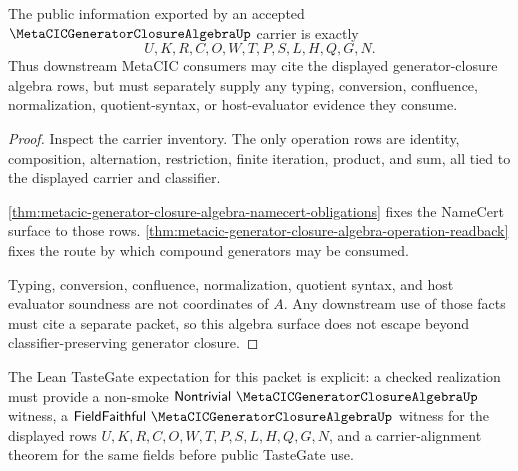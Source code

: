 \begin{theorem}
\label{thm:metacic-generator-closure-algebra-nonescape}
The public information exported by an accepted $\MetaCICGeneratorClosureAlgebraUp$ carrier is exactly
$$
U,K,R,C,O,W,T,P,S,L,H,Q,G,N .
$$
Thus downstream MetaCIC consumers may cite the displayed generator-closure algebra rows, but must separately supply any typing, conversion, confluence, normalization, quotient-syntax, or host-evaluator evidence they consume.
\end{theorem}
\begin{proof}
Inspect the carrier inventory. The only operation rows are identity, composition, alternation, restriction, finite iteration, product, and sum, all tied to the displayed carrier and classifier.

\autoref{thm:metacic-generator-closure-algebra-namecert-obligations} fixes the NameCert surface to those rows. \autoref{thm:metacic-generator-closure-algebra-operation-readback} fixes the route by which compound generators may be consumed.

Typing, conversion, confluence, normalization, quotient syntax, and host evaluator soundness are not coordinates of $A$. Any downstream use of those facts must cite a separate packet, so this algebra surface does not escape beyond classifier-preserving generator closure.
\end{proof}



The Lean TasteGate expectation for this packet is explicit: a checked realization must provide a non-smoke $\mathsf{Nontrivial}\ \MetaCICGeneratorClosureAlgebraUp$ witness, a $\mathsf{FieldFaithful}\ \MetaCICGeneratorClosureAlgebraUp$ witness for the displayed rows $U,K,R,C,O,W,T,P,S,L,H,Q,G,N$, and a carrier-alignment theorem for the same fields before public TasteGate use.

